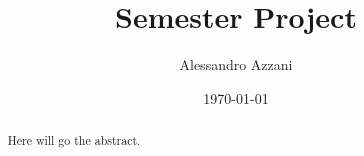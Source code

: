 \documentclass[12pt,a4paper]{report}
\title{Semester Project}
\author{Alessandro Azzani}
\date{\today}
\theoremstyle{definition}
\begin{document}
\maketitle


\begin{abstract}
    Here will go the abstract.
\end{abstract}


\begingroup
    \hypersetup{linkcolor=black}
    \tableofcontents
\endgroup












\printbibliography[heading=bibintoc]
\end{document}
